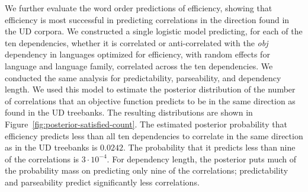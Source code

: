 \documentclass[9pt,twocolumn,twoside,lineno]{pnas-new}
\begin{document}
We further evaluate the word order predictions of efficiency, showing that efficiency is most successful in predicting correlations in the direction found in the UD corpora.
We constructed a single logistic model predicting, for each of the ten dependencies, whether it is correlated or anti-correlated with the \emph{obj} dependency in languages optimized for efficiency, with random effects for language and language family, correlated across the ten dependencies.
We conducted the same analysis for predictability, parseability, and dependency length.
We used this model to estimate the posterior distribution of the number of correlations that an objective function predicts to be in the same direction as found in the UD treebanks.
The resulting distributions are shown in Figure~\ref{fig:posterior-satisfied-count}.
The estimated posterior probability that efficiency predicts less than all ten dependencies to correlate in the same direction as in the UD treebanks is $0.0242$. The probability that it predicts less than nine of the correlations is $3\cdot 10^{-4}$.
For dependency length, the posterior puts much of the probability mass on predicting only nine of the correlations; predictability and parseability predict significantly less correlations.
\end{document}
